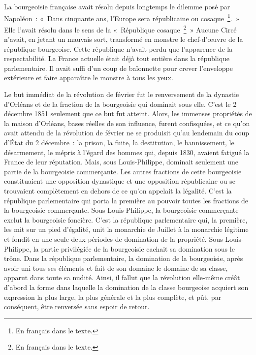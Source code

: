 \documentclass[french,twoside]{book} %
\begin{document}
La bourgeoisie française avait résolu depuis longtemps le dilemme posé par Napoléon : « Dans cinquante ans, l’Europe sera républicaine ou cosaque \footnote{En français dans le texte.}. » Elle l’avait résolu dans le sens de la « République cosaque \footnote{En français dans le texte.} » Aucune Circé n’avait, en jetant un mauvais sort, transformé en monstre le chef-d’œuvre de la république bourgeoise. Cette république n’avait perdu que l’apparence de la respectabilité. La France actuelle était déjà tout entière dans la république parlementaire. Il avait suffi d’un coup de baïonnette pour crever l’enveloppe extérieure et faire apparaître le monstre à tous les yeux.\par
Le but immédiat de la révolution de février fut le renversement de la dynastie d’Orléans et de la fraction de la bourgeoisie qui dominait sous elle. C’est le 2 décembre 1851 seulement que ce but fut atteint. Alors, les immenses propriétés de la maison d’Orléans, bases réelles de son influence, furent confisquées, et ce qu’on avait attendu de la révolution de février ne se produisit qu’au lendemain du coup d’État du 2 décembre : la prison, la fuite, la destitution, le bannissement, le désarmement, le mépris à l’égard des hommes qui, depuis 1830, avaient fatigué la France de leur réputation. Mais, sous Louis-Philippe, dominait seulement une partie de la bourgeoisie commerçante. Les autres fractions de cette bourgeoisie constituaient une opposition dynastique et une opposition républicaine ou se trouvaient complètement en dehors de ce qu’on appelait la légalité. C’est la république parlementaire qui porta la première au pouvoir toutes les fractions de la bourgeoisie commerçante. Sous Louis-Philippe, la bourgeoisie commerçante exclut la bourgeoisie foncière. C’est la république parlementaire qui, la première, les mit sur un pied d’égalité, unit la monarchie de Juillet à la monarchie légitime et fondit en une seule deux périodes de domination de la propriété. Sous Louis-Philippe, la partie privilégiée de la bourgeoisie cachait sa domination sous le trône. Dans la république parlementaire, la domination de la bourgeoisie, après avoir uni tous ses éléments et fait de son domaine le domaine de sa classe, apparut dans toute sa nudité. Ainsi, il fallut que la révolution elle-même créât d’abord la forme dans laquelle la domination de la classe bourgeoise acquiert son expression la plus large, la plus générale et la plus complète, et pût, par conséquent, être renversée sans espoir de retour.\par
\end{document}
